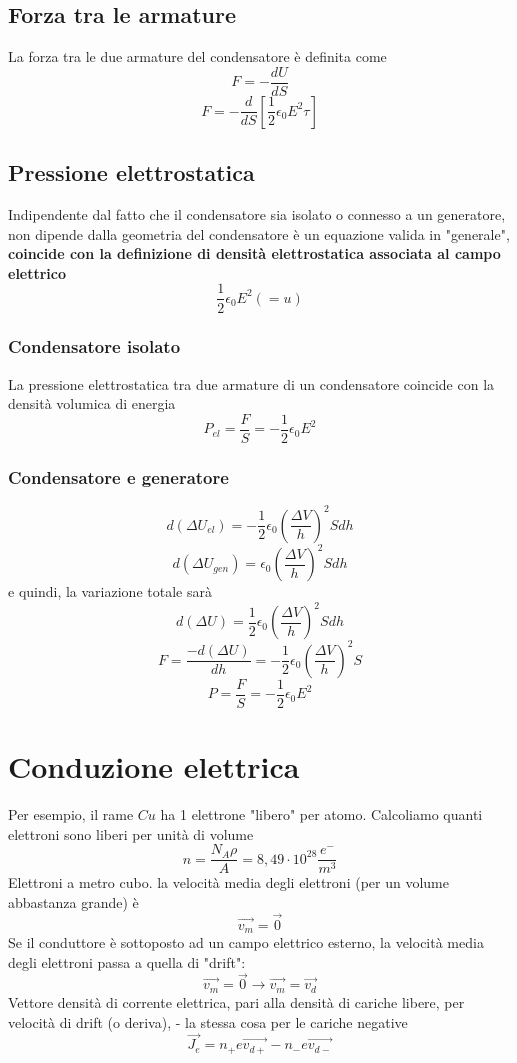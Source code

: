 \documentclass[a4paper]{report}
\begin{document}
  \subsection{Forza tra le armature}
  La forza tra le due armature del condensatore è definita come
  $$ F = -\frac{dU}{dS} $$
  $$ F = -\frac{d}{dS}[\frac{1}{2} \epsilon_0 E^2 \tau] $$

  \subsection{Pressione elettrostatica}
  Indipendente dal fatto che il condensatore sia isolato o connesso a un generatore, non dipende dalla geometria del condensatore è un equazione valida in "generale", \textbf{coincide con la definizione di densità elettrostatica associata al campo elettrico}
  $$ \frac{1}{2} \epsilon_0 E^2 (=u) $$

  \subsubsection{Condensatore isolato}
  La pressione elettrostatica tra due armature di un condensatore coincide con la densità volumica di energia
  $$ P_{el} = \frac{F}{S} = -\frac{1}{2} \epsilon_0 E^2 $$

  \subsubsection{Condensatore e generatore}
  $$ d(\Delta U_{el}) = -\frac{1}{2} \epsilon_0 (\frac{\Delta V}{h})^2 S dh $$
  $$ d(\Delta U_{gen}) = \epsilon_0 (\frac{\Delta V}{h})^2 S dh $$
  e quindi, la variazione totale sarà
  $$ d(\Delta U) =\frac{1}{2} \epsilon_0 (\frac{\Delta V}{h})^2 S dh $$
  $$ F = \frac{-d(\Delta U)}{dh} = -\frac{1}{2} \epsilon_0 (\frac{\Delta V}{h})^2 S $$
  $$ P = \frac{F}{S} = -\frac{1}{2} \epsilon_0 E^2 $$

  \section{Conduzione elettrica}
  Per esempio, il rame $Cu$ ha 1 elettrone "libero" per atomo. Calcoliamo quanti elettroni sono liberi per unità di volume
  $$ n = \frac{N_A \rho}{ A} = 8,49 \cdot 10^{28} \frac{e^-}{m^3} $$
  Elettroni a metro cubo. la velocità media degli elettroni (per un volume abbastanza grande) è
  $$\vec{v_m} = \vec{0}$$
  Se il conduttore è sottoposto ad un campo elettrico esterno, la velocità media degli elettroni passa a quella di "drift":
  $$ \vec{v_m} = \vec{0} \longrightarrow \vec{v_m} = \vec{v_d} $$
  Vettore densità di corrente elettrica, pari alla densità di cariche libere, per velocità di drift (o deriva), - la stessa cosa per le cariche negative
  $$ \vec{J_e} = n_+ e \vec{v_{d+}} - n_- e \vec{v_{d-}}$$
\end{document}
